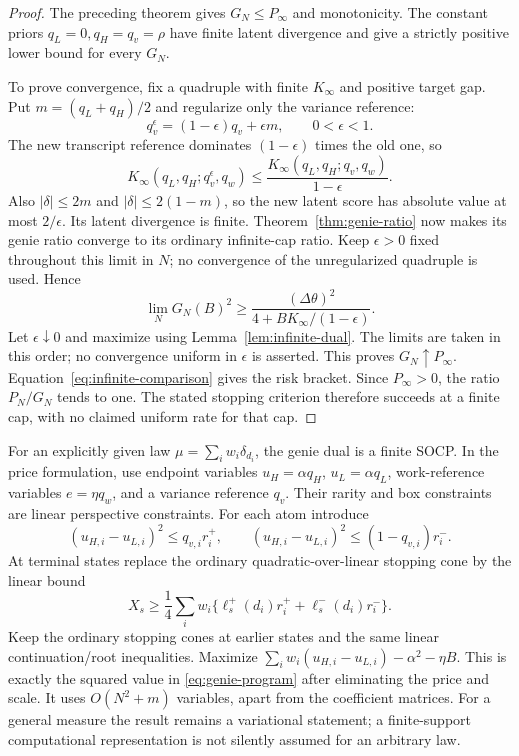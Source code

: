 \begin{proof}
The preceding theorem gives $G_N\le P_\infty$ and monotonicity. The
constant priors $q_L=0,q_H=q_v=\rho$ have finite latent divergence and
give a strictly positive lower bound for every $G_N$.

To prove convergence, fix a quadruple with finite $K_\infty$ and positive
target gap. Put $m=(q_L+q_H)/2$ and regularize only the variance reference:
\[
 q_v^\epsilon=(1-\epsilon)q_v+\epsilon m,
 \qquad 0<\epsilon<1.
\]
The new transcript reference dominates $(1-\epsilon)$ times the old one,
so
\[
 K_\infty(q_L,q_H;q_v^\epsilon,q_w)
 \le\frac{K_\infty(q_L,q_H;q_v,q_w)}{1-\epsilon}.
\]
Also $|\delta|\le2m$ and $|\delta|\le2(1-m)$, so the new latent score
has absolute value at most $2/\epsilon$. Its latent divergence is finite.
Theorem~\ref{thm:genie-ratio} now makes its genie ratio converge to its
ordinary infinite-cap ratio. Keep $\epsilon>0$ fixed throughout
this limit in $N$; no convergence of the unregularized
quadruple is used. Hence
\[
 \lim_NG_N(B)^2\ge
 \frac{(\Delta\theta)^2}{4+B K_\infty/(1-\epsilon)}.
\]
Let $\epsilon\downarrow0$ and maximize using
Lemma~\ref{lem:infinite-dual}. The limits are taken in this order;
no convergence uniform in $\epsilon$ is asserted. This proves
$G_N\uparrow P_\infty$.
Equation~\eqref{eq:infinite-comparison} gives the risk bracket.
Since $P_\infty>0$, the ratio $P_N/G_N$ tends to one. The stated stopping
criterion therefore succeeds at a finite cap, with no claimed uniform
rate for that cap.
\end{proof}

For an explicitly given law $\mu=\sum_iw_i\delta_{d_i}$, the genie dual
is a finite SOCP. In the price formulation, use endpoint variables
$u_H=\alpha q_H$, $u_L=\alpha q_L$, work-reference variables
$e=\eta q_w$, and a variance reference $q_v$. Their rarity and box
constraints are linear perspective constraints. For each atom introduce
\[
 (u_{H,i}-u_{L,i})^2\le q_{v,i}r_i^+,
 \qquad
 (u_{H,i}-u_{L,i})^2\le(1-q_{v,i})r_i^-.
\]
At terminal states replace the ordinary quadratic-over-linear stopping
cone by the linear bound
\[
 X_s\ge\frac14\sum_iw_i
           \{\ell_s^+(d_i)r_i^++\ell_s^-(d_i)r_i^-\}.
\]
Keep the ordinary stopping cones at earlier states and the same linear
continuation/root inequalities. Maximize
$\sum_iw_i(u_{H,i}-u_{L,i})-\alpha^2-\eta B$.
This is exactly the squared value in \eqref{eq:genie-program} after
eliminating the price and scale. It uses $O(N^2+m)$ variables, apart from
the coefficient matrices. For a general measure the result remains a
variational statement; a finite-support computational representation is
not silently assumed for an arbitrary law.

